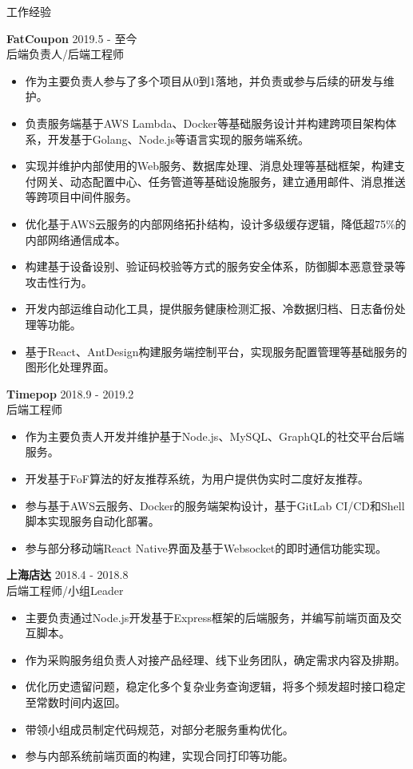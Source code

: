 \documentclass{resume} %
\begin{document}
\begin{rSection}{工作经验}

\textbf{FatCoupon} \hfill 2019.5 - 至今\\
后端负责人/后端工程师 \hfill \textit{}
\begin{itemize}
  \itemsep -3pt {}
  \item 作为主要负责人参与了多个项目从0到1落地，并负责或参与后续的研发与维护。
  \item 负责服务端基于AWS Lambda、Docker等基础服务设计并构建跨项目架构体系，开发基于Golang、Node.js等语言实现的服务端系统。
  \item 实现并维护内部使用的Web服务、数据库处理、消息处理等基础框架，构建支付网关、动态配置中心、任务管道等基础设施服务，建立通用邮件、消息推送等跨项目中间件服务。
  \item 优化基于AWS云服务的内部网络拓扑结构，设计多级缓存逻辑，降低超75\%的内部网络通信成本。
  \item 构建基于设备设别、验证码校验等方式的服务安全体系，防御脚本恶意登录等攻击性行为。
  \item 开发内部运维自动化工具，提供服务健康检测汇报、冷数据归档、日志备份处理等功能。
  \item 基于React、AntDesign构建服务端控制平台，实现服务配置管理等基础服务的图形化处理界面。
\end{itemize}

\textbf{Timepop} \hfill 2018.9 - 2019.2\\
后端工程师 \hfill \textit{}
\begin{itemize}
  \itemsep -3pt {}
  \item 作为主要负责人开发并维护基于Node.js、MySQL、GraphQL的社交平台后端服务。
  \item 开发基于FoF算法的好友推荐系统，为用户提供伪实时二度好友推荐。
  \item 参与基于AWS云服务、Docker的服务端架构设计，基于GitLab CI/CD和Shell脚本实现服务自动化部署。
  \item 参与部分移动端React Native界面及基于Websocket的即时通信功能实现。
\end{itemize}

\textbf{上海店达} \hfill 2018.4 - 2018.8\\
后端工程师/小组Leader \hfill \textit{}
\begin{itemize}
  \itemsep -3pt {}
  \item 主要负责通过Node.js开发基于Express框架的后端服务，并编写前端页面及交互脚本。
  \item 作为采购服务组负责人对接产品经理、线下业务团队，确定需求内容及排期。
  \item 优化历史遗留问题，稳定化多个复杂业务查询逻辑，将多个频发超时接口稳定至常数时间内返回。
  \item 带领小组成员制定代码规范，对部分老服务重构优化。
  \item 参与内部系统前端页面的构建，实现合同打印等功能。
\end{itemize}


\end{rSection}
\end{document}
